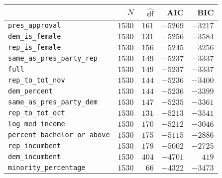 \begin{tabular}{lrrrr}
\toprule
{} &     $N$ & $\hat{\mathsf{df}}$ &      AIC &      BIC \\
\midrule
\texttt{pres\_approval}               &  $1530$ &               $161$ &  $-5269$ &  $-3217$ \\
\texttt{dem\_is\_female}              &  $1530$ &               $131$ &  $-5256$ &  $-3584$ \\
\texttt{rep\_is\_female}              &  $1530$ &               $156$ &  $-5245$ &  $-3256$ \\
\texttt{same\_as\_pres\_party\_rep}   &  $1530$ &               $149$ &  $-5237$ &  $-3337$ \\
\texttt{full}                         &  $1530$ &               $149$ &  $-5237$ &  $-3337$ \\
\texttt{rep\_to\_tot\_nov}            &  $1530$ &               $144$ &  $-5236$ &  $-3400$ \\
\texttt{dem\_percent}                 &  $1530$ &               $144$ &  $-5236$ &  $-3399$ \\
\texttt{same\_as\_pres\_party\_dem}   &  $1530$ &               $147$ &  $-5235$ &  $-3361$ \\
\texttt{rep\_to\_tot\_oct}            &  $1530$ &               $131$ &  $-5213$ &  $-3541$ \\
\texttt{log\_med\_income}             &  $1530$ &               $170$ &  $-5212$ &  $-3046$ \\
\texttt{percent\_bachelor\_or\_above} &  $1530$ &               $175$ &  $-5115$ &  $-2886$ \\
\texttt{rep\_incumbent}               &  $1530$ &               $179$ &  $-5002$ &  $-2725$ \\
\texttt{dem\_incumbent}               &  $1530$ &               $404$ &  $-4701$ &    $419$ \\
\texttt{minority\_percentage}         &  $1530$ &                $66$ &  $-4322$ &  $-3473$ \\
\bottomrule
\end{tabular}
